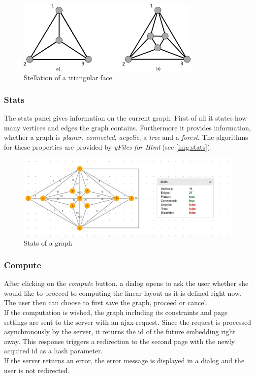 \begin{figure}
\begin{center}
\includegraphics[width=0.8\textwidth]{figures/figIndex/stellation.png}
\caption{Stellation of a triangular face}
\label{img:stell}
\end{center}
\end{figure}
\subsubsection{Stats}
The stats panel gives information on the current graph. First of all it states how many vertices and edges the graph contains. Furthermore it provides information, whether a graph is \textit{planar}, \textit{connected}, \textit{acyclic}, a  \textit{tree} and a \textit{forest}. The algorithms for these properties are provided by \textit{yFiles for Html} (see \autoref{img:stats}).
\begin{figure}[!h]
\begin{center}
\includegraphics[width=1\textwidth]{figures/figIndex/StatsPanels.jpg}
\caption{Stats of a graph}
\label{img:stats}
\end{center}
\end{figure}
\subsubsection{Compute}
After clicking on the \textit{compute} button, a dialog opens to ask the user whether she would like to proceed to computing the linear layout as it is defined right now. The user then can choose to first save the graph, proceed or cancel.\\
If the computation is wished, the graph including its constraints and page settings are sent to the server with an ajax-request. Since the request is processed asynchronously by the server, it returns the id of the future embedding right away. This response triggers a redirection to the second page with the newly acquired id as a hash parameter.\\
If the server returns an error, the error message is displayed in a dialog and the user is not redirected.
